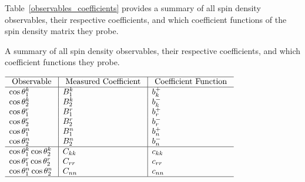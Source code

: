 \begin{refsection}
Table~\ref{observables_coefficients} provides a summary of all spin density observables, their respective coefficients, and which coefficient functions of the spin density matrix they probe.
\begin{table}[htb]
\caption{A summary of all spin density observables, their respective coefficients, and which coefficient functions they probe. 
        }
\vspace*{6pt}
\begin{center}
\begin{adjustbox}{scale=0.85,center}
\begin{math}
\begin{array}{l|l|l}
\hline \text { Observable } & \text { Measured Coefficient } & \text { Coefficient Function } \\
\hline 
\cos \theta_1^k & B_1^k & b_k^{+} \\
\cos \theta_2^k & B_2^k & b_k^{-} \\
\cos \theta_1^r & B_1^r & b_r^{+} \\
\cos \theta_2^r & B_2^r & b_r^{-} \\
\cos \theta_1^n & B_1^n & b_n^{+} \\
\cos \theta_2^n & B_2^n & b_n^{-} \\
\hline 
\cos \theta_1^k \cos \theta_2^k & C_{k k} & c_{k k} \\
\cos \theta_1^r \cos \theta_2^r & C_{r r} & c_{r r} \\
\cos \theta_1^n \cos \theta_2^n & C_{n n} & c_{n n} \\
\hline 

\end{array}
\end{math}
\end{adjustbox}
\end{center}
\end{table}
\end{refsection}
